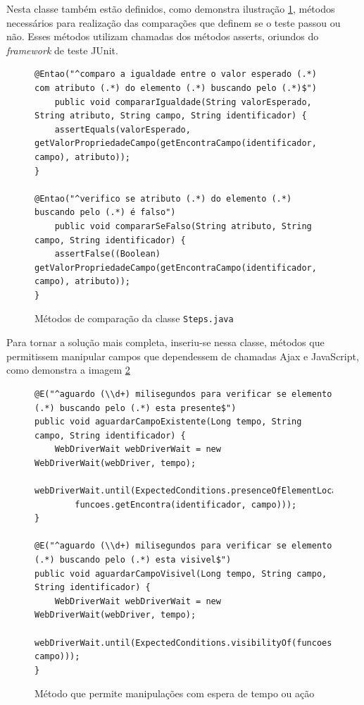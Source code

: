 \documentclass[tg]{mdtufsm}
\begin{document}
Nesta classe também estão definidos, como demonstra ilustração \ref{code:stepsJUnit}, métodos necessários para realização das comparações que definem se o teste passou ou não. Esses métodos utilizam chamadas dos métodos asserts, oriundos do \emph{framework} de teste JUnit.

\begin{figure}[!htt]
	\begin{lstlisting}
@Entao("^comparo a igualdade entre o valor esperado (.*) com atributo (.*) do elemento (.*) buscando pelo (.*)$")
	public void compararIgualdade(String valorEsperado, String atributo, String campo, String identificador) {
	assertEquals(valorEsperado, getValorPropriedadeCampo(getEncontraCampo(identificador, campo), atributo));
}

@Entao("^verifico se atributo (.*) do elemento (.*) buscando pelo (.*) é falso")
	public void compararSeFalso(String atributo, String campo, String identificador) {
	assertFalse((Boolean) getValorPropriedadeCampo(getEncontraCampo(identificador, campo), atributo));
}
	\end{lstlisting}
	\caption{Métodos de comparação da classe \texttt{Steps.java}}
	\label{code:stepsJUnit}
\end{figure}

Para tornar a solução mais completa, inseriu-se nessa classe, métodos que permitissem manipular campos que dependessem de chamadas Ajax e JavaScript, como demonstra a imagem \ref{code:Método WebDriverWait}

\begin{figure}[!htt]
	\begin{lstlisting}
@E("^aguardo (\\d+) milisegundos para verificar se elemento (.*) buscando pelo (.*) esta presente$")
public void aguardarCampoExistente(Long tempo, String campo, String identificador) {
    WebDriverWait webDriverWait = new WebDriverWait(webDriver, tempo);
    webDriverWait.until(ExpectedConditions.presenceOfElementLocated(
        funcoes.getEncontra(identificador, campo)));
}

@E("^aguardo (\\d+) milisegundos para verificar se elemento (.*) buscando pelo (.*) esta visivel$")
public void aguardarCampoVisivel(Long tempo, String campo, String identificador) {
    WebDriverWait webDriverWait = new WebDriverWait(webDriver, tempo);
    webDriverWait.until(ExpectedConditions.visibilityOf(funcoes.getEncontraCampo(identificador, campo)));
}
	\end{lstlisting}
	\caption{Método que permite manipulações com espera de tempo ou ação}
	\label{code:Método WebDriverWait}
\end{figure}
\end{document}
